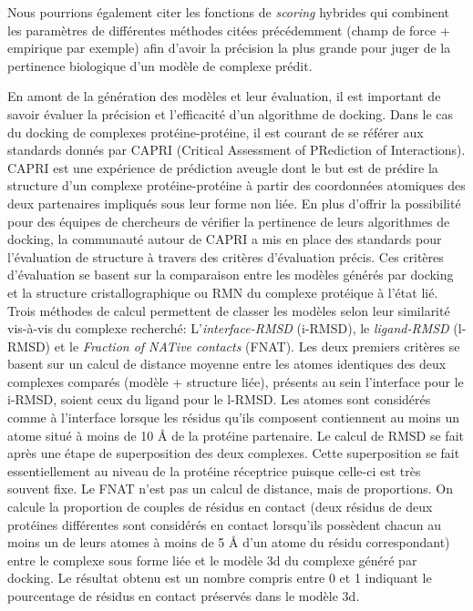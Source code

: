 Nous pourrions également citer les fonctions de \textit{scoring} hybrides qui combinent les paramètres de différentes méthodes citées précédemment (champ de force + empirique par exemple) afin d'avoir la précision la plus grande pour juger de la pertinence biologique d'un modèle de complexe prédit.

En amont de la génération des modèles et leur évaluation, il est important de savoir évaluer la précision et l'efficacité d'un algorithme de docking. Dans le cas du docking de complexes protéine-protéine, il est courant de se référer aux standards donnés par CAPRI (Critical Assessment of PRediction of Interactions). CAPRI est une expérience de prédiction aveugle dont le but est de prédire la structure d'un complexe protéine-protéine à partir des coordonnées atomiques des deux partenaires impliqués sous leur forme non liée. En plus d'offrir la possibilité pour des équipes de chercheurs de vérifier la pertinence de leurs algorithmes de docking, la communauté autour de CAPRI a mis en place des standards pour l'évaluation de structure à travers des critères d'évaluation précis. Ces critères d'évaluation se basent sur la comparaison entre les modèles générés par docking et la structure cristallographique ou RMN du complexe protéique à l'état lié. Trois méthodes de calcul permettent de classer les modèles selon leur similarité vis-à-vis du complexe recherché: L'\textit{interface-RMSD} (i-RMSD), le \textit{ligand-RMSD} (l-RMSD) et le \textit{Fraction of NATive contacts} (FNAT). Les deux premiers critères se basent sur un calcul de distance moyenne entre les atomes identiques des deux complexes comparés (modèle + structure liée), présents au sein l'interface pour le i-RMSD, soient ceux du ligand pour le l-RMSD. Les atomes sont considérés comme à l'interface lorsque les résidus qu'ils composent contiennent au moins un atome situé à moins de 10 \r{A} de la protéine partenaire. Le calcul de RMSD se fait après une étape de superposition des deux complexes. Cette superposition se fait essentiellement au niveau de la protéine réceptrice puisque celle-ci est très souvent fixe. Le FNAT n'est pas un calcul de distance, mais de proportions. On calcule la proportion de couples de résidus en contact (deux résidus de deux protéines différentes sont considérés en contact lorsqu'ils possèdent chacun au moins un de leurs atomes à moins de 5 \r{A} d'un atome du résidu correspondant) entre le complexe sous forme liée et le modèle 3d du complexe généré par docking. Le résultat obtenu est un nombre compris entre 0 et 1 indiquant le pourcentage de résidus en contact préservés dans le modèle 3d.


